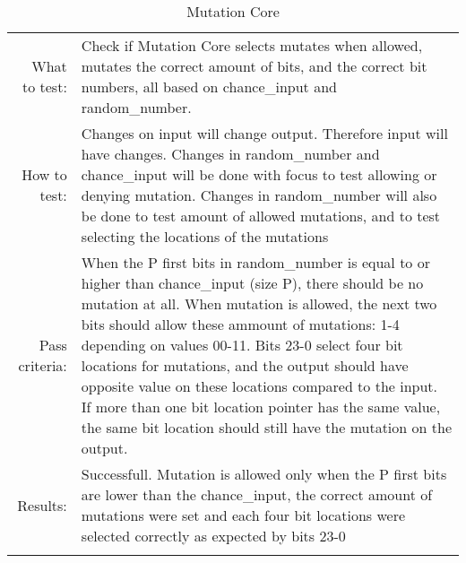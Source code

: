 \begin{table}[H]
  \begin{tabular}{r | p{9cm}}
    \noalign{\smallskip}\hline\noalign{\smallskip}
    
    What to test:  & Check if Mutation Core selects mutates when allowed, mutates the 
                     correct amount of bits, and the correct bit numbers, all based
                     on chance\_input and random\_number.\\

    \noalign{\smallskip}\hline\noalign{\smallskip}

    How to test:   &    Changes on input will change output. Therefore input will have 
                        changes.
                        Changes in random\_number and chance\_input  will be done with
                        focus to test allowing or denying mutation.
                        Changes in random\_number will also be done to test amount of 
                        allowed mutations, and to test selecting the locations of the 
                        mutations
                        \\
                      
    \noalign{\smallskip}\hline\noalign{\smallskip}

    Pass criteria: &    When the P first bits in random\_number is equal to or higher 
                        than chance\_input (size P), there should be no mutation at all.
                        When mutation is allowed, the next two bits should allow these 
                        ammount of mutations: 1-4 depending on values 00-11.
                        Bits 23-0 select four bit locations for mutations, and the 
                        output should have opposite value on these locations compared to
                        the input.
                        If more than one bit location pointer has the same value, the 
                        same bit location should still have the mutation on the output.
                                                \\
    \noalign{\smallskip}\hline\noalign{\smallskip}
    
    Results: &      Successfull. 
                    Mutation is allowed only when the P first bits are lower than the
                    chance\_input, the correct amount of mutations were set and each 
                    four bit locations were selected correctly as expected by bits 23-0
                    \\
   \noalign{\smallskip}\hline\noalign{\smallskip}
  
  
  \end{tabular}
  \caption{Mutation Core}
  \label{testing:components:genetic_pipeline:mutation_core}
\end{table}
